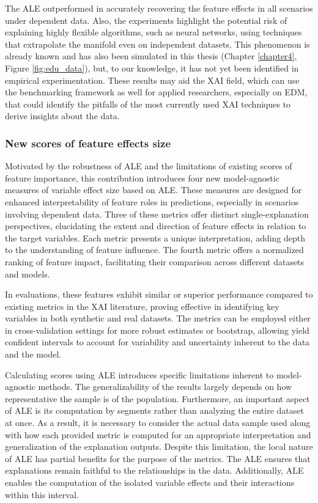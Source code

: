 The \gls{ALE} outperformed in accurately recovering the feature effects in all scenarios under dependent data. Also, the experiments highlight the potential risk of explaining highly flexible algorithms, such as neural networks, using techniques that extrapolate the manifold even on independent datasets. This phenomenon is already known and has also been simulated in this thesis (Chapter \ref{chapter4}, Figure \ref{fig:edu_data}), but, to our knowledge, it has not yet been identified in empirical experimentation. These results may aid the \gls{XAI} field, which can use the benchmarking framework as well for applied researchers, especially on \gls{EDM}, that could identify the pitfalls of the most currently used \gls{XAI} techniques to derive insights about the data.

\subsubsection{New scores of feature effects size}

Motivated by the robustness of \gls{ALE} and the limitations of existing scores of feature importance, this contribution introduces four new model-agnostic measures of variable effect size based on \gls{ALE}. These measures are designed for enhanced interpretability of feature roles in predictions, especially in scenarios involving dependent data. Three of these metrics offer distinct single-explanation perspectives, elucidating the extent and direction of feature effects in relation to the target variables. Each metric presents a unique interpretation, adding depth to the understanding of feature influence. The fourth metric offers a normalized ranking of feature impact, facilitating their comparison across different datasets and models. 

In evaluations, these features exhibit similar or superior performance compared to existing metrics in the \gls{XAI} literature, proving effective in identifying key variables in both synthetic and real datasets. The metrics can be employed either in cross-validation settings for more robust estimates or bootstrap, allowing yield confident intervals to account for variability and uncertainty inherent to the data and the model.

Calculating scores using \gls{ALE} introduces specific limitations inherent to model-agnostic methods. The generalizability of the results largely depends on how representative the sample is of the population. Furthermore, an important aspect of \gls{ALE} is its computation by segments rather than analyzing the entire dataset at once. As a result, it is necessary to consider the actual data sample used along with how each provided metric is computed for an appropriate interpretation and generalization of the explanation outputs. Despite this limitation, the local nature of \gls{ALE} has partial benefits for the purpose of the metrics. The \gls{ALE} ensures that explanations remain faithful to the relationships in the data. Additionally, \gls{ALE} enables the computation of the isolated variable effects and their interactions within this interval.

